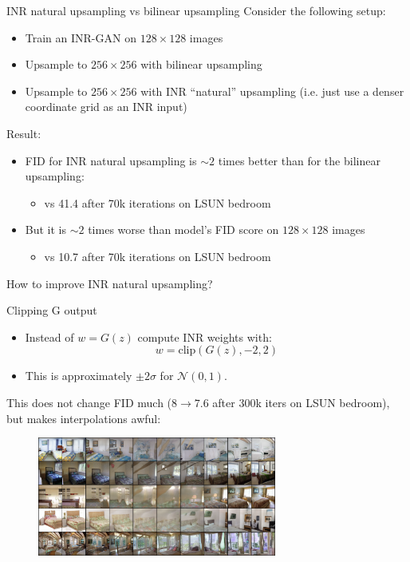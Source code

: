 \documentclass[10pt]{beamer}
\begin{document}
\begin{frame}{INR natural upsampling vs bilinear upsampling}
Consider the following setup:
\begin{itemize}
    \item\pause Train an INR-GAN on $128\times 128$ images
    \item\pause Upsample to $256 \times 256$ with bilinear upsampling
    \item\pause Upsample to $256 \times 256$ with INR ``natural'' upsampling (i.e. just use a denser coordinate grid as an INR input)
\end{itemize}

\pause
Result:
\begin{itemize}
    \item\pause FID for INR natural upsampling is $\sim 2$ times better than for the bilinear upsampling:
    \begin{itemize}
        \item{} vs 41.4 after 70k iterations on LSUN bedroom
    \end{itemize}
    \item\pause But it is $\sim 2$ times worse than model's FID score on $128\times 128$ images
    \begin{itemize}
        \item{} vs 10.7 after 70k iterations on LSUN bedroom
    \end{itemize}
\end{itemize}

How to improve INR natural upsampling?
\end{frame}


\begin{frame}{Clipping G output}
\pause
\begin{itemize}
    \item\pause Instead of $w = G(z)$ compute INR weights with:
    $$w = \text{clip}(G(z), -2, 2)$$
    \item\pause This is approximately $\pm 2\sigma$ for $\mathcal{N}(0,1)$. 
\end{itemize}

\pause This does not change FID much ($8 \to 7.6$ after 300k iters on LSUN bedroom), but makes interpolations awful:
\begin{figure}
\centering
\includegraphics[width=0.7\textwidth]{images/normal_clip_lerp.png}
\end{figure}
\end{frame}
\end{document}
